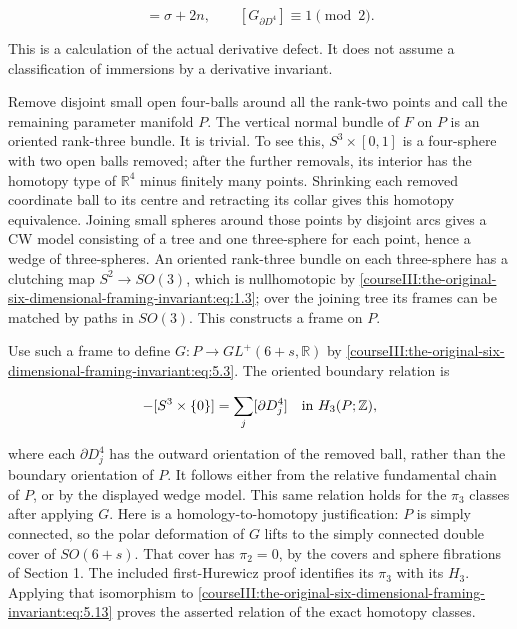 \begin{equation}
[G_{\partial D^4}]=\sigma+2n,\qquad
             [G_{\partial D^4}]\equiv1\pmod2.
 \label{courseIII:the-original-six-dimensional-framing-invariant:eq:5.12}
\end{equation}

This is a calculation of the actual derivative defect. It does not assume a classification of immersions by a derivative invariant.

Remove disjoint small open four-balls around all the rank-two points and call the remaining parameter manifold \(P\). The vertical normal bundle of \(F\) on \(P\) is an oriented rank-three bundle. It is trivial. To see this, \(S^3\times[0,1]\) is a four-sphere with two open balls removed; after the further removals, its interior has the homotopy type of \(\mathbb R^4\) minus finitely many points. Shrinking each removed coordinate ball to its centre and retracting its collar gives this homotopy equivalence. Joining small spheres around those points by disjoint arcs gives a CW model consisting of a tree and one three-sphere for each point, hence a wedge of three-spheres. An oriented rank-three bundle on each three-sphere has a clutching map \(S^2\to SO(3)\), which is nullhomotopic by \eqref{courseIII:the-original-six-dimensional-framing-invariant:eq:1.3}; over the joining tree its frames can be matched by paths in \(SO(3)\). This constructs a frame on \(P\).

Use such a frame to define \(G:P\to GL^+(6+s,\mathbb R)\) by \eqref{courseIII:the-original-six-dimensional-framing-invariant:eq:5.3}. The oriented boundary relation is

\begin{equation}
[S^3\times\{1\}]-[S^3\times\{0\}]
       =\sum_j[\partial D^4_j]\quad\hbox{in }H_3(P;\mathbb Z),
 \label{courseIII:the-original-six-dimensional-framing-invariant:eq:5.13}
\end{equation}

where each \(\partial D^4_j\) has the outward orientation of the removed ball, rather than the boundary orientation of \(P\). It follows either from the relative fundamental chain of \(P\), or by the displayed wedge model. This same relation holds for the \(\pi_3\) classes after applying \(G\). Here is a homology-to-homotopy justification: \(P\) is simply connected, so the polar deformation of \(G\) lifts to the simply connected double cover of \(SO(6+s)\). That cover has \(\pi_2=0\), by the covers and sphere fibrations of Section 1. The included first-Hurewicz proof identifies its \(\pi_3\) with its \(H_3\). Applying that isomorphism to \eqref{courseIII:the-original-six-dimensional-framing-invariant:eq:5.13} proves the asserted relation of the exact homotopy classes.

